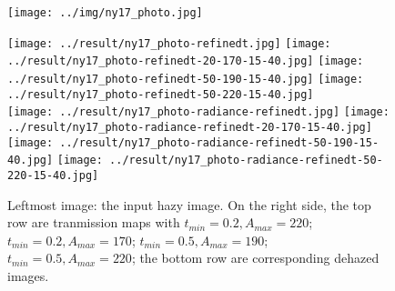 \documentclass{article}
\begin{document}
\begin{figure}[H]
    \centering
    \begin{minipage}[b]{0.319\linewidth}
        \centering
        \texttt{[image: ../img/ny17\_photo.jpg]}
    \end{minipage}
    \begin{minipage}[b]{0.66\linewidth}
       \centering
        \texttt{[image: ../result/ny17\_photo-refinedt.jpg]}
        \texttt{[image: ../result/ny17\_photo-refinedt-20-170-15-40.jpg]}
        \texttt{[image: ../result/ny17\_photo-refinedt-50-190-15-40.jpg]}
        \texttt{[image: ../result/ny17\_photo-refinedt-50-220-15-40.jpg]}
        \\
        \texttt{[image: ../result/ny17\_photo-radiance-refinedt.jpg]}
        \texttt{[image: ../result/ny17\_photo-radiance-refinedt-20-170-15-40.jpg]}
        \texttt{[image: ../result/ny17\_photo-radiance-refinedt-50-190-15-40.jpg]}
        \texttt{[image: ../result/ny17\_photo-radiance-refinedt-50-220-15-40.jpg]}
    \end{minipage}
    
    \captionsetup{singlelinecheck=off}
    \caption{Leftmost image: the input hazy image. On the right side, the top row are tranmission maps with
        $t_{min} = 0.2, A_{max} = 220$;
        $t_{min} = 0.2, A_{max} = 170$;
        $t_{min} = 0.5, A_{max} = 190$;
        $t_{min} = 0.5, A_{max} = 220$;
        the bottom row are corresponding dehazed images.
    }
    \label{fig:sp3}
\end{figure}
\end{document}
